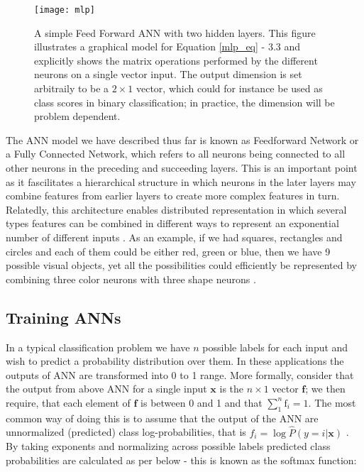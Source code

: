 \documentclass[12pt]{report}
\begin{document}
\begin{figure}[h!]
  \centering
	\texttt{[image: mlp]}
	\caption{A simple Feed Forward ANN with two hidden layers. This figure illustrates a graphical model for Equation \ref{mlp_eq} - 3.3 and explicitly shows the matrix operations performed by the different neurons on a single vector input. The output dimension is set arbitraily to be a $2\times1$ vector, which could for instance be used as class scores in binary classification; in practice, the dimension will be problem dependent.}
	\label{fig:mlp}
\end{figure}

The ANN model we have described thus far is known as Feedforward Network or a Fully Connected Network, which refers to all neurons being connected to all other neurons in the preceding and succeeding layers. This is an important point as it fascilitates a hierarchical structure in which neurons in the later layers may combine features from earlier layers to create more complex features in turn. Relatedly, this architecture enables distributed representation in which several types features can be combined in different ways to represent an exponential number of different inputs \cite{Hinton1985}. As an example, if we had squares, rectangles and circles and each of them could be either red, green or blue, then we have 9 possible visual objects, yet all the possibilities could efficiently be represented by combining three color neurons with three shape neurons \cite{Goodfellow2016}. 

\subsection{Training ANNs}

In a typical classification problem we have $n$ possible labels for each input and wish to predict a probability distribution over them. In these applications the outputs of ANN are transformed into 0 to 1 range. More formally, consider that the output from above ANN for a single input $\mathbf{x}$ is the $n \times 1$ vector $\mathbf{f}$; we then require, that each element of $\mathbf{f}$ is between 0 and 1 and that $\sum_1^n \text{f}_i = 1$. The most common way of doing this is to assume that the output of the ANN are unnormalized (predicted) class log-probabilities, that is $f_i = \log \hat{P}(y = i | \mathbf{x})$ \cite{Goodfellow2016}. By taking exponents and normalizing across possible labels predicted class probabilities are calculated as per below - this is known as the softmax function:
\end{document}
